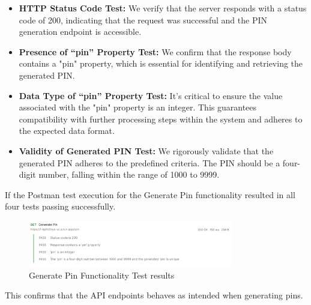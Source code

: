 \begin{itemize}
    \begin{itemize}
        \item \textbf{HTTP Status Code Test:} We verify that the server responds with a status code of 200, indicating that the request was successful and the PIN generation endpoint is accessible.

        \item \textbf{Presence of “pin” Property Test:} We confirm that the response body contains a "pin" property, which is essential for identifying and retrieving the generated PIN.

        \item \textbf{Data Type of “pin” Property Test:} It's critical to ensure the value associated with the "pin" property is an integer. This guarantees compatibility with further processing steps within the system and adheres to the expected data format.

        \item \textbf{Validity of Generated PIN Test:} We rigorously validate that the generated PIN adheres to the predefined criteria. The PIN should be a four-digit number, falling within the range of 1000 to 9999.
    \end{itemize}
\end{itemize}

If the Postman test execution for the Generate Pin functionality resulted in all four tests passing successfully.
\begin{figure}[h]
    \centering
    \includegraphics[width=0.8\textwidth]{images/testing1}
    \caption{Generate Pin Functionality Test results}
    \label{fig:testresults-postman}
\end{figure}
This confirms that the API endpoints behaves as intended when generating pins.

